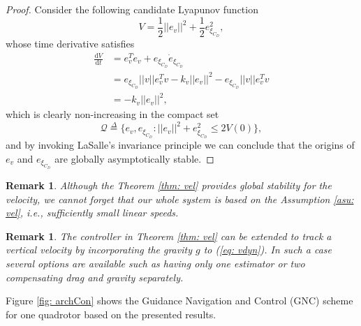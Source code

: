 \documentclass[a4paper, onecolumn]{ieeeconf}
\newcommand{\dfb}{\stackrel{\Delta}{=}}
\newtheorem{remark}[theorem]{Remark}
\begin{document}
\begin{proof}
Consider the following candidate Lyapunov function
\begin{equation}
	V = \frac{1}{2}||e_v||^2 + \frac{1}{2} e_{\xi_{C_D}}^2,
\end{equation}
whose time derivative satisfies
\begin{align}
	\frac{\mathrm{d}V}{\mathrm{d}t} &= e_v^T\dot e_v + e_{\xi_{C_D}}\dot  e_{\xi_{C_D}} \nonumber \\
	&= e_{\xi_{C_D}} ||v||e_v^Tv - k_v||e_v||^2 - e_{\xi_{C_D}} ||v||e_v^Tv \nonumber  \\
	&= - k_v||e_v||^2,
\end{align}
which is clearly non-increasing in the compact set
\begin{equation}
	\mathcal{Q} \dfb \Big\{e_v, e_{\xi_{C_D}}: ||e_v||^2 + e_{\xi_{C_D}}^2 \leq 2V(0) \Big\},
\end{equation}
and by invoking LaSalle's invariance principle we can conclude that the origins of $e_v$ and $e_{\xi_{C_D}}$ are globally asymptotically stable.
\end{proof}
\begin{remark}
	Although the Theorem \ref{thm: vel} provides global stability for the velocity, we cannot forget that our whole system is based on the Assumption \ref{asu: vel}, i.e., sufficiently small linear speeds.
\end{remark}
\begin{remark}
	The controller in Theorem \ref{thm: vel} can be extended to track a vertical velocity by incorporating the gravity $g$ to (\ref{eq: vdyn}). In such a case several options are available such as having only one estimator or two compensating drag and gravity separately.
\end{remark}

Figure \ref{fig: archCon} shows the Guidance Navigation and Control (GNC) scheme for one quadrotor based on the presented results.
\end{document}
